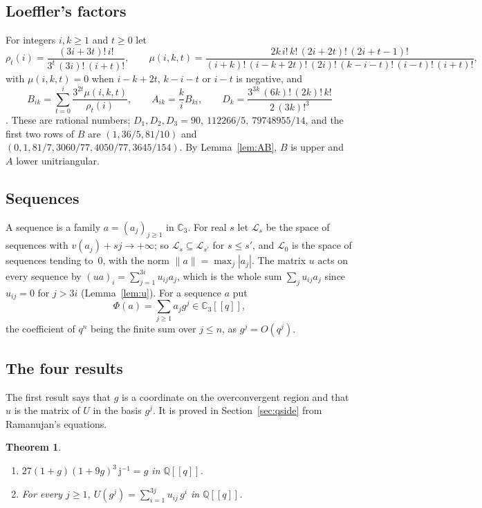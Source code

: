 \documentclass[11pt]{amsart}
\newtheorem{theorem}{Theorem}[section]
\theoremstyle{definition}
\numberwithin{equation}{section}
\newcommand{\lean}[1]{\ignorespaces}
\newcommand{\Q}{\mathbb{Q}}
\newcommand{\Cp}{\mathbb{C}_3}
\newcommand{\jj}{\mathrm{j}}
\newcommand{\jinv}{\jj^{-1}}
\newcommand{\cL}{\mathcal{L}}
\newcommand{\Lc}{\mathcal{L}_0}
\begin{document}
\subsection*{Loeffler's factors}
For integers $i,k\ge1$ and $t\ge0$ let
\[
\rho_t(i)=\frac{(3i+3t)!\,i!}{3^t\,(3i)!\,(i+t)!},\qquad
\mu(i,k,t)=\frac{2k\,i!\,k!\,(2i+2t)!\,(2i+t-1)!}{(i+k)!\,(i-k+2t)!\,(2i)!\,(k-i-t)!\,(i-t)!\,(i+t)!},
\]
with $\mu(i,k,t)=0$ when $i-k+2t$, $k-i-t$ or $i-t$ is negative, and
\[
B_{ik}=\sum_{t=0}^{i}\frac{3^{2t}\mu(i,k,t)}{\rho_t(i)},\qquad A_{ik}=\frac{k}{i}B_{ki},\qquad D_k=\frac{3^{3k}\,(6k)!\,(2k)!\,k!}{2\,(3k)!^3}
\]
\cite[\S3]{Loe08}. These are rational numbers; $D_1,D_2,D_3=90,\ 112266/5,\ 79748955/14$, and the first two rows of $B$ are $(1,36/5,81/10)$ and $(0,1,81/7,3060/77,4050/77,3645/154)$. By Lemma~\ref{lem:AB}, $B$ is upper and $A$ lower unitriangular.

\subsection*{Sequences}
A sequence is a family $a=(a_j)_{j\ge1}$ in $\Cp$. For real $s$ let $\cL_s$ be the space of sequences with $v(a_j)+sj\to+\infty$; so $\cL_s\subseteq\cL_{s'}$ for $s\le s'$, and $\Lc$ is the space of sequences tending to~$0$, with the norm $\|a\|=\max_j|a_j|$. The matrix $u$ acts on every sequence by $(ua)_i=\sum_{j=1}^{3i}u_{ij}a_j$, which is the whole sum $\sum_ju_{ij}a_j$ since $u_{ij}=0$ for $j>3i$ (Lemma~\ref{lem:u}). For a sequence $a$ put
\[
\Phi(a)=\sum_{j\ge1}a_jg^j\in\Cp[[q]],
\]
the coefficient of $q^n$ being the finite sum over $j\le n$, as $g^j=O(q^j)$.

\subsection*{The four results}
The first result says that $g$ is a coordinate on the overconvergent region and that $u$ is the matrix of $U$ in the basis $g^j$. It is proved in Section~\ref{sec:qside} from Ramanujan's equations.

\begin{theorem}\label{thm:qside}\lean{CalegariSlopes.Bridge.jhyp_Sol, CalegariSlopes.Bridge.c4_Sol}
\begin{enumerate}
\item[(a)] $27(1+g)(1+9g)^3\,\jinv=g$ in $\Q[[q]]$.
\item[(b)] For every $j\ge1$, $U(g^j)=\sum_{i=1}^{3j}u_{ij}\,g^i$ in $\Q[[q]]$.
\end{enumerate}
\end{theorem}
\end{document}
